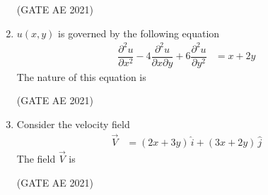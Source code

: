 \documentclass[journal,12pt,onecolumn]{IEEEtran}
\theoremstyle{remark}
\begin{document}
\begin{flushleft}
\begin{enumerate}
\hfill (GATE AE 2021)

\begin{enumerate}
\end{enumerate}


\item 
$u(x,y)$ is governed by the following equation
\begin{align*}
\dfrac{\partial^2 u}{\partial x^2} - 4\dfrac{\partial^2 u}{\partial x \partial y} + 6\dfrac{\partial^2 u}{\partial y^2} &= x + 2y
\end{align*}
The nature of this equation is

\hfill (GATE AE 2021)

\begin{enumerate}
\end{enumerate}

\item 
Consider the velocity field 
\begin{align*}
\vec{V} &= (2x+3y)\,\hat{i} + (3x+2y)\,\hat{j}
\end{align*}
The field $\vec{V}$ is

\hfill (GATE AE 2021)

\begin{enumerate}
\end{enumerate}


\end{enumerate}
\end{flushleft}
\end{document}
